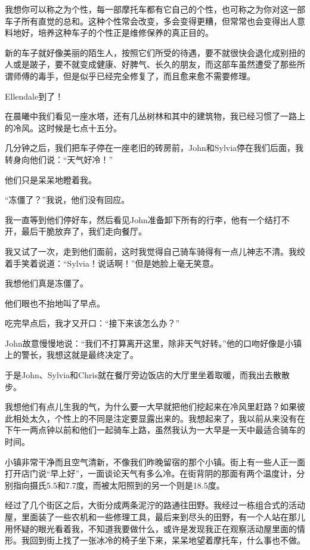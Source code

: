 \documentclass[UTF8]{article}
\begin{document}
\par 我想你可以称之为个性，每一部摩托车都有它自己的个性，也可称之为你对这一部车子所有直觉的总和。这种个性常会改变，多会变得更糟，但常常也会变得出人意料地好，培养这种车子的个性正是维修保养的真正目的。
\par 新的车子就好像美丽的陌生人，按照它们所受的待遇，要不就很快会退化成别扭的人或是跛子，要不就变成健康、好脾气、长久的朋友，而这部车虽然遭受了那些所谓师傅的毒手，但是似乎已经完全修复了，而且愈来愈不需要修理。
\par Ellendale到了！
\par 在晨曦中我们看见一座水塔，还有几丛树林和其中的建筑物，我已经习惯了一路上的冷风。这时候是七点十五分。
\par 几分钟之后，我们把车子停在一座老旧的砖房前，John和Sylvia停在我们后面，我转身向他们说：“天气好冷！”
\par 他们只是呆呆地瞪着我。
\par “冻僵了？”我说，他们没有回应。
\par 我一直等到他们停好车，然后看见John准备卸下所有的行李，他有一个结打不开，最后干脆放弃了，我们走向餐厅。
\par 我又试了一次，走到他们面前，这时我觉得自己骑车骑得有一点儿神志不清。我绞着手笑着说道：“Sylvia！说话啊！”但是她脸上毫无笑意。
\par 我想他们真是冻僵了。
\par 他们眼也不抬地叫了早点。
\par 吃完早点后，我才又开口：“接下来该怎么办？”
\par John故意慢慢地说：“我们不打算离开这里，除非天气好转。”他的口吻好像是小镇上的警长，我想这就是最终决定了。
\par 于是John、Sylvia和Chris就在餐厅旁边饭店的大厅里坐着取暖，而我出去散散步。
\par 我想他们有点儿生我的气，为什么要一大早就把他们挖起来在冷风里赶路？如果彼此相处太久，个性上的不同是注定要显露出来的。我想起来了，我以前从来没有在下午一两点钟以前和他们一起骑车上路，虽然我认为一大早是一天中最适合骑车的时间。
\par 小镇非常干净而且空气清新，不像我们昨晚留宿的那个小镇。街上有一些人正一面打开店门说“早上好”，一面谈论天气有多么冷。在街背阴的那面有两个温度计，分别指向摄氏5.5和7.7度，而被太阳照到的另一个则是18.5度。
\par 经过了几个街区之后，大街分成两条泥泞的路通往田野。我经过一栋组合式的活动屋，里面装了一些农机和一些修理工具，最后来到尽头的田野，有一个人站在那儿用怀疑的眼光看着我，不知道我要做什么，或许是发现我正在观察活动屋里面的情形。我回到街上找了一张冰冷的椅子坐下来，呆呆地望着摩托车，什么事也不做。
\end{document}

